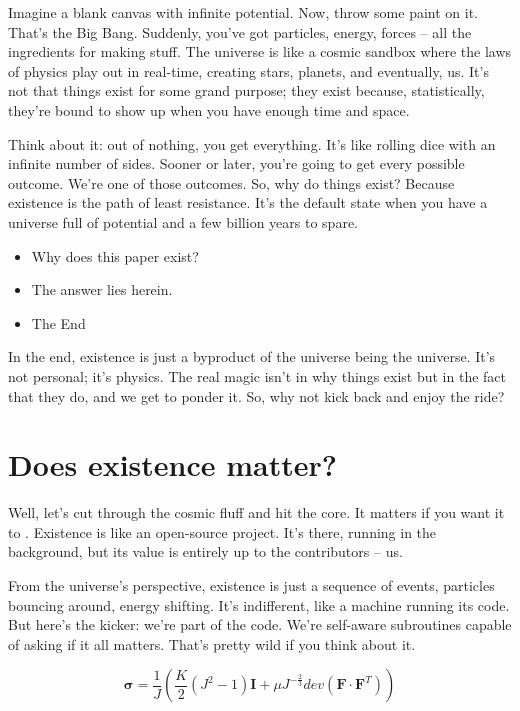 \documentclass{Axon}
\begin{document}
Imagine a blank canvas with infinite potential. Now, throw some paint on it. That's the Big Bang. Suddenly, you've got particles, energy, forces – all the ingredients for making stuff. The universe is like a cosmic sandbox where the laws of physics play out in real-time, creating stars, planets, and eventually, us. It’s not that things exist for some grand purpose; they exist because, statistically, they’re bound to show up when you have enough time and space.

Think about it: out of nothing, you get everything. It's like rolling dice with an infinite number of sides. Sooner or later, you're going to get every possible outcome. We’re one of those outcomes. So, why do things exist? Because existence is the path of least resistance. It’s the default state when you have a universe full of potential and a few billion years to spare.

\begin{itemize}
    \item Why does this paper exist?
    \item The answer lies herein.
    \item The End
\end{itemize}

In the end, existence is just a byproduct of the universe being the universe. It’s not personal; it’s physics. The real magic isn't in why things exist but in the fact that they do, and we get to ponder it. So, why not kick back and enjoy the ride?
\section{Does existence matter?}
Well, let's cut through the cosmic fluff and hit the core. It matters if you want it to \cite{MALAJETMAROVA2017209}. Existence is like an open-source project. It’s there, running in the background, but its value is entirely up to the contributors – us.

From the universe's perspective, existence is just a sequence of events, particles bouncing around, energy shifting. It’s indifferent, like a machine running its code. But here’s the kicker: we’re part of the code. We’re self-aware subroutines capable of asking if it all matters. That’s pretty wild if you think about it.

\begin{equation}
    \boldsymbol{\sigma} = \frac{1}{J} \left(\frac{K}{2}(J^2-1)\boldsymbol{I}+\mu J^{-\frac{2}{3}} dev(\mathbf{F} \cdot \mathbf{F}^T)\right)
\end{equation}
\end{document}
